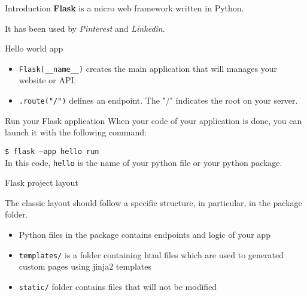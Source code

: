 \begin{frame}{Introduction}
    \alert{\textbf{Flask}} is a micro web framework written in Python.\\
    

    It has been used by \textit{Pinterest} and \textit{Linkedin}.

\end{frame}

\begin{frame}{Hello world app}

    \begin{itemize}
        \item \texttt{Flask(\_\_name\_\_)} creates the main application that will manages your website or API.
        \item \texttt{\@app.route("/")} defines an endpoint. The "/" indicates the root on your server.
    \end{itemize}
    

\end{frame}

\begin{frame}{Run your Flask application}
When your code of your application is done, you can launch it with the following command:

\texttt{\$ flask --app hello run}
\\
In this code, \texttt{hello} is the name of your python file or your python package.
\end{frame}

\begin{frame}{Flask project layout}
    \begin{minipage}{0.49\linewidth}
    \end{minipage}
    \begin{minipage}{0.49\linewidth}
        The classic layout should follow a specific structure, in particular, in the package folder.
        \begin{itemize}
            \item \alert{Python files} in the package contains endpoints and logic of your app
            \item \alert{\texttt{templates/}} is a folder containing html files which are used to generated custom pages using jinja2 templates
            \item \alert{\texttt{static/}} folder contains files that will not be modified
        \end{itemize}
    \end{minipage}

\end{frame}

